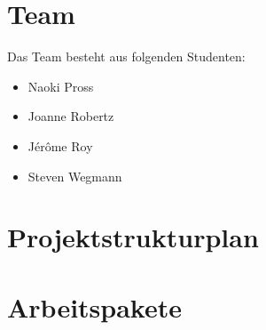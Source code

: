 \documentclass[a4paper, twosided, 11pt]{scrartcl}
\begin{document}
\clearpage
\tableofcontents
\listoffigures
\listoftables

\section{Team}

Das Team besteht aus folgenden Studenten:
\begin{itemize}
  \item Naoki Pross
  \item Joanne Robertz
  \item J\'er\^ome Roy
  \item Steven Wegmann
\end{itemize}

\section{Projektstrukturplan}

\begin{figure}[H]
  \centering
  
\end{figure}

\section{Arbeitspakete}
\end{document}
